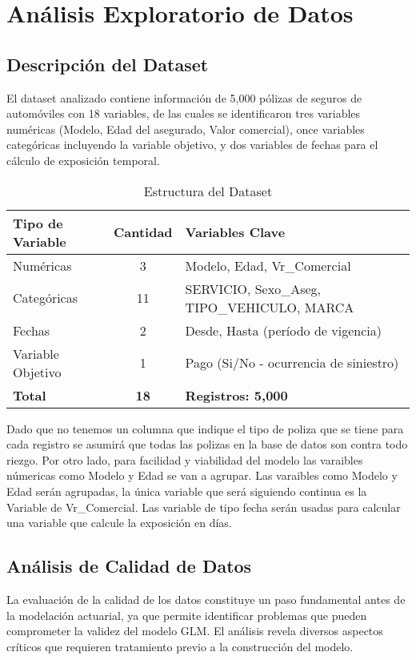 \section{Análisis Exploratorio de Datos}

\subsection{Descripción del Dataset}

El dataset analizado contiene información de 5,000 pólizas de seguros de automóviles con 18 variables, de las cuales se identificaron tres variables numéricas (Modelo, Edad del asegurado, Valor comercial), once variables categóricas incluyendo la variable objetivo, y dos variables de fechas para el cálculo de exposición temporal.

\begin{table}[H]
\centering
\caption{Estructura del Dataset}
\begin{tabular}{|l|c|l|}
\hline
\textbf{Tipo de Variable} & \textbf{Cantidad} & \textbf{Variables Clave} \\
\hline
Numéricas & 3 & Modelo, Edad, Vr\_Comercial \\
Categóricas & 11 & SERVICIO, Sexo\_Aseg, TIPO\_VEHICULO, MARCA \\
Fechas & 2 & Desde, Hasta (período de vigencia) \\
Variable Objetivo & 1 & Pago (Si/No - ocurrencia de siniestro) \\
\hline
\textbf{Total} & \textbf{18} & \textbf{Registros: 5,000} \\
\hline
\end{tabular}
\end{table}

Dado que no tenemos un columna que indique el tipo de poliza que se tiene para cada registro se asumirá que todas las polizas en la base de datos son contra todo riezgo. Por otro lado, para facilidad y viabilidad del modelo las varaibles númericas como Modelo y Edad se van a agrupar. Las varaibles como Modelo y Edad serán agrupadas, la única variable que será siguiendo continua es la Variable de Vr\_Comercial. Las variable de tipo fecha serán usadas para calcular una variable que calcule la exposición en días. 
\subsection{Análisis de Calidad de Datos}

La evaluación de la calidad de los datos constituye un paso fundamental antes de la modelación actuarial, ya que permite identificar problemas que pueden comprometer la validez del modelo GLM. El análisis revela diversos aspectos críticos que requieren tratamiento previo a la construcción del modelo.

